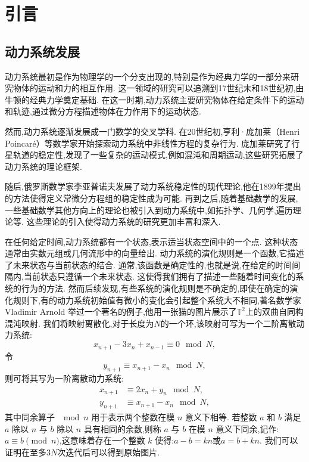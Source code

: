 \chapter{引言}\label{chap:introduction}
\section{动力系统发展}
动力系统最初是作为物理学的一个分支出现的,特别是作为经典力学的一部分来研究物体的运动和力的相互作用. 这一领域的研究可以追溯到17世纪末和18世纪初,由牛顿的经典力学奠定基础. 在这一时期,动力系统主要研究物体在给定条件下的运动和轨迹,通过微分方程描述物体在力作用下的运动状态. 

然而,动力系统逐渐发展成一门数学的交叉学科. 在20世纪初,亨利·庞加莱（Henri Poincaré）等数学家开始探索动力系统中非线性方程的复杂行为. 庞加莱研究了行星轨道的稳定性,发现了一些复杂的运动模式,例如混沌和周期运动,这些研究拓展了动力系统的理论框架. 

随后,俄罗斯数学家李亚普诺夫发展了动力系统稳定性的现代理论,他在1899年提出的方法使得定义常微分方程组的稳定性成为可能. 再到之后,随着基础数学的发展,一些基础数学其他方向上的理论也被引入到动力系统中,如拓扑学、几何学,遍历理论等. 这些理论的引入使得动力系统的研究更加丰富和深入. 

在任何给定时间,动力系统都有一个状态,表示适当状态空间中的一个点. 这种状态通常由实数元组或几何流形中的向量给出. 动力系统的演化规则是一个函数,它描述了未来状态与当前状态的结合. 通常,该函数是确定性的,也就是说,在给定的时间间隔内,当前状态只遵循一个未来状态\cite{strogatz2018nonlinear}. 这使得我们拥有了描述一些随着时间变化的系统的行为的方法. 然而后续发现,有些系统的演化规则是不确定的,即使在确定的演化规则下,有的动力系统初始值有微小的变化会引起整个系统大不相同,著名数学家 Vladimir Arnold 举过一个著名的例子,他用一张猫的图片展示了$\mathbb{T}^2$上的双曲自同构混沌映射. 我们将映射离散化,对于长度为$N$的一个环,该映射可写为一个二阶离散动力系统:
\begin{equation}
    x_{n+1}-3x_n+x_{n-1}\equiv 0 \mod N,
\end{equation}
令\begin{equation}
    y_{n+1}\equiv x_{n+1}-x_n \mod N,
\end{equation}
则可将其写为一阶离散动力系统:
\begin{equation}
    \begin{aligned}
        x_{n+1}&\equiv 2x_n+y_n \mod N,\\
        y_{n+1}&\equiv x_{n+1}-x_n \mod N,
    \end{aligned}
\end{equation}
其中同余算子 \( \mod n \) 用于表示两个整数在模 \( n \) 意义下相等. 若整数 \( a \) 和 \( b \) 满足 \( a \) 除以 \( n \) 与 \( b \) 除以 \( n \) 具有相同的余数,则称 \( a \) 与 \( b \) 在模 \( n \) 意义下同余,记作:$a \equiv b \pmod{n}$,这意味着存在一个整数 \( k \) 使得:$a - b = kn$或$a = b + kn$. 我们可以证明在至多$3N$次迭代后可以得到原始图片\cite{enwiki:1223508209}. 

